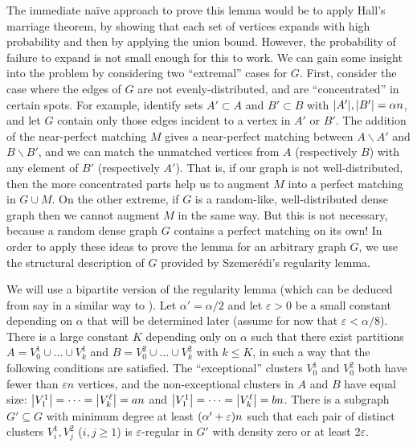 \documentclass[11pt,english]{article}
\theoremstyle{plain}
\theoremstyle{definition}
\theoremstyle{definition}
\theoremstyle{plain}
\theoremstyle{plain}
\theoremstyle{plain}
\theoremstyle{plain}
\theoremstyle{remark}
\theoremstyle{remark}
\let\originalleft\left
\let\originalright\right
\renewcommand{\left}{\mathopen{}\mathclose\bgroup\originalleft}
\renewcommand{\right}{\aftergroup\egroup\originalright}
\begin{document}
The immediate na\"ive approach to prove this lemma would be to apply
Hall's marriage theorem, by showing that each set of vertices expands
with high probability and then by applying the union bound. However, the
probability of failure to expand is not small enough for this to work.
We can gain some insight into the problem by considering two ``extremal''
cases for $G$. First, consider the case where the edges of $G$ are
not evenly-distributed, and are ``concentrated'' in certain spots.
For example, identify sets $A'\subset A$ and $B'\subset B$ with
$\left|A'\right|,\left|B'\right|=\alpha n$, and let $G$ contain
only those edges incident to a vertex in $A'$ or $B'$. The addition
of the near-perfect matching $M$ gives a near-perfect matching between
$A\backslash A'$ and $B\backslash B'$, and we can match the unmatched
vertices from $A$ (respectively $B$) with any element of $B'$ (respectively
$A'$). That is, if our graph is not well-distributed, then the more
concentrated parts help us to augment $M$ into a perfect matching in
$G\cup M$. On the other extreme, if $G$ is a random-like, well-distributed
dense graph then we cannot augment $M$ in the same way. But this
is not necessary, because a random dense graph $G$ contains a perfect
matching on its own! In order to apply these ideas to prove the lemma
for an arbitrary graph $G$, we use the structural description of
$G$ provided by Szemer\'edi's regularity lemma.

We will use a bipartite version of the regularity lemma (which can
be deduced from say \cite[Theorem~2.3]{Tao05} in a similar way to
\cite[Theorem~1.10]{KS96}). Let $\alpha'=\alpha/2$ and let $\varepsilon>0$
be a small constant depending on $\alpha$ that will be determined
later (assume for now that $\varepsilon<\alpha/8$). There is a large
constant $K$ depending only on $\alpha$ such that there exist partitions
$A=V_{0}^{1}\cup\dots\cup V_{k}^{1}$ and $B=V_{0}^{2}\cup\dots\cup V_{k}^{2}$
with $k\le K$, in such a way that the following conditions are satisfied.
The ``exceptional'' clusters $V_{0}^{1}$ and $V_{0}^{2}$ both
have fewer than $\varepsilon n$ vertices, and the non-exceptional
clusters in $A$ and $B$ have equal size: $\left|V_{1}^{1}\right|=\dots=\left|V_{k}^{\ell}\right|=an$
and $\left|V_{1}^{1}\right|=\dots=\left|V_{k}^{\ell}\right|=bn$.
There is a subgraph $G'\subseteq G$ with minimum degree at least
$\left(\alpha'+\varepsilon\right)n$ such that each pair of distinct
clusters $V_{i}^{1},V_{j}^{2}$ ($i,j\ge1$) is $\varepsilon$-regular
in $G'$ with density zero or at least $2\varepsilon$.
\end{document}
